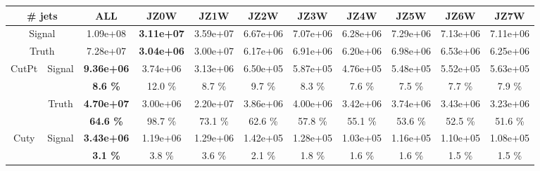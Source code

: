 \begin{appendices}
\begin{landscape} 
\begin{table}
  \small
  \centering
  \begin{tabular}{|c|c|>{\bfseries}c|c|c|c|c|c|c|c|c|}
    \hline
     \multicolumn{2}{|c|}{\# jets}  & ALL      & JZ0W     & JZ1W     & JZ2W     & JZ3W     & JZ4W     & JZ5W     & JZ6W     & JZ7W     \\
    \hline                                                              
    \hline                                                              
     \multicolumn{2}{|c|}{Signal}                               & 1.09e+08 & 3.11e+07 & 3.59e+07 & 6.67e+06 & 7.07e+06 & 6.28e+06 & 7.29e+06 & 7.13e+06 & 7.11e+06 \\
    \hline                                                                                          
     \multicolumn{2}{|c|}{Truth}                                & 7.28e+07 & 3.04e+06 & 3.00e+07 & 6.17e+06 & 6.91e+06 & 6.20e+06 & 6.98e+06 & 6.53e+06 & 6.25e+06 \\
    \hline                                                                                      
    \hline                                                                                      
    \multirow{4}{*}{CutPt}          & \multirow{2}{*}{Signal}   & 9.36e+06 & 3.74e+06 & 3.13e+06 & 6.50e+05 & 5.87e+05 & 4.76e+05 & 5.48e+05 & 5.52e+05 & 5.63e+05 \\
                                    &                           & 8.6 \%   & 12.0 \%  & 8.7 \%   & 9.7 \%   & 8.3 \%   & 7.6 \%   & 7.5 \%   & 7.7 \%   & 7.9 \%   \\
    \cline{2-11}                                                                                
                                    & \multirow{2}{*}{Truth}    & 4.70e+07 & 3.00e+06 & 2.20e+07 & 3.86e+06 & 4.00e+06 & 3.42e+06 & 3.74e+06 & 3.43e+06 & 3.23e+06 \\
                                    &                           & 64.6 \%  & 98.7 \%  & 73.1 \%  & 62.6 \%  & 57.8 \%  & 55.1 \%  & 53.6 \%  & 52.5 \%  & 51.6 \%  \\
    \hline                                                                                      
    \hline                                                                                      
    \multirow{4}{*}{Cuty}           & \multirow{2}{*}{Signal}   & 3.43e+06 & 1.19e+06 & 1.29e+06 & 1.42e+05 & 1.28e+05 & 1.03e+05 & 1.16e+05 & 1.10e+05 & 1.08e+05 \\
                                    &                           & 3.1 \%   & 3.8 \%   & 3.6 \%   & 2.1 \%   & 1.8 \%   & 1.6 \%   & 1.6 \%   & 1.5 \%   & 1.5 \%   \\

\end{tabular}
\end{table}
\end{landscape}
\end{appendices}
